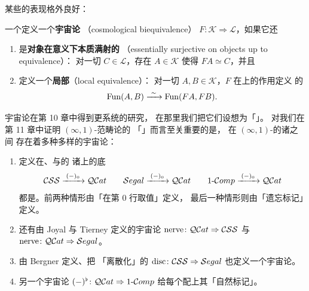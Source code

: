 某些\trCosmologicalFunctor{}的表现格外良好：

\begin{definition}\label{def:cosmological-biequivalence}
一个\trCosmologicalFunctor{}定义一个\textbf{宇宙论\trBiequivalence}
（cosmological biequivalence）
$F\colon\mathcal{K}\Rightarrow\mathcal{L}$，如果它还
\begin{enumerate}[label=(\roman*)]
\item 是\textbf{对象在\trEquivalence{}意义下本质满射的}
  （essentially surjective on objects up to equivalence）：
  对一切 $C\in\mathcal{L}$，存在 $A\in\mathcal{K}$
  使得 $FA\simeq C$，并且
\item 定义一个\textbf{局部\trEquivalence}（local equivalence）：
  对一切 $A,B\in\mathcal{K}$，$F$ 在\trFunctorSpace{}上的作用定义%
  \trQuasiCategory{}的\trEquivalence
  \[
  \Fun(A,B)\xrightarrow{\ \sim\ }\Fun(FA,FB).
  \]
\end{enumerate}
\end{definition}

宇宙论\trBiequivalence{}在第 10 章中得到更系统的研究，
在那里我们把它们设想为「\trChangeOfModel{}」\trFunctor{}。
对我们在第 11 章中证明 $(\infty,1)$-范畴论的
「\trModelIndependence{}」而言至关重要的是，
在 $(\infty,1)$-\trCategory{}的诸\trInfinityCosmos{}之间
存在着多种多样的宇宙论\trBiequivalence{}：

\begin{example}[附录 E.2]\label{exa:biequivalences-models}
\begin{enumerate}[label=(\roman*)]
\item 定义在\trCompleteSegalSpaces{}、\trSegalCategories{}与\trOneComplicialSets{}的
  诸\trInfinityCosmos{}上的底\trQuasiCategory\trFunctor
  \[
  \mathcal{CSS}\xrightarrow{\;(-)_0\;}\mathcal{Q}\mathcal{C}at\qquad
  \mathcal{S}egal\xrightarrow{\;(-)_0\;}\mathcal{Q}\mathcal{C}at\qquad
  1\text{-}\mathcal{C}omp\xrightarrow{\;(-)_0\;}\mathcal{Q}\mathcal{C}at
  \]
  都是\trBiequivalence{}。前两种情形由「在第 0 行取值」定义，
  最后一种情形则由「遗忘标记」定义。
\item 还有由 Joyal 与 Tierney \cite{bib64} 定义的宇宙论\trBiequivalence{}
  $\mathrm{nerve}\colon\mathcal{Q}\mathcal{C}at\Rightarrow\mathcal{CSS}$
  与 $\mathrm{nerve}\colon\mathcal{Q}\mathcal{C}at\Rightarrow\mathcal{S}egal$。
\item 由 Bergner \cite{bib14} 定义、把\trCompleteSegalSpaces
  「离散化」的\trFunctor{}
  $\mathrm{disc}\colon\mathcal{CSS}\Rightarrow\mathcal{S}egal$
  也定义一个宇宙论\trBiequivalence{}。
\item 另一个宇宙论\trBiequivalence{}
  $(-)^{\flat}\colon\mathcal{Q}\mathcal{C}at\Rightarrow 1\text{-}\mathcal{C}omp$
  给每个\trQuasiCategory{}配上其「自然标记」。
\end{enumerate}
\end{example}

